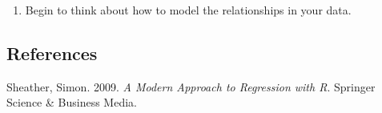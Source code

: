 \documentclass[]{article}
\providecommand{\tightlist}{%
  \setlength{\itemsep}{0pt}\setlength{\parskip}{0pt}}
\begin{document}
\begin{enumerate}
\def\labelenumi{\arabic{enumi}.}
\setcounter{enumi}{1}
\tightlist
\item
  Begin to think about how to model the relationships in your data.
\end{enumerate}

\hypertarget{references}{%
\subsection*{References}\label{references}}

\hypertarget{refs}{}
\leavevmode\hypertarget{ref-sheather2009}{}%
Sheather, Simon. 2009. \emph{A Modern Approach to Regression with R}.
Springer Science \& Business Media.
\end{document}
